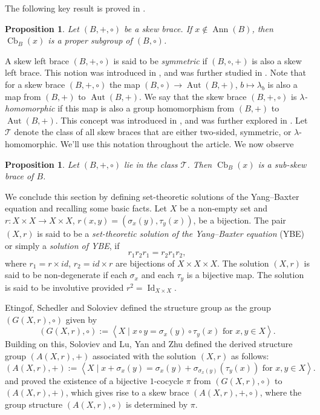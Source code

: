 \documentclass[11pt, oneside]{amsart}
\numberwithin{equation}{section}
\theoremstyle{plain}
\newtheorem{pro}[equation]{Proposition}
\theoremstyle{definition}
\newcommand{\Cb}{\operatorname{Cb} }
\newcommand{\Id}{\operatorname{Id}}
\newcommand{\gen}[1]{\left < #1 \right >}
\newcommand{\Aut}{\operatorname{Aut} }
\newcommand{\Ann}{\operatorname{Ann} }
\begin{document}
 The following key result is proved in \cite[Theorem 3.3]{CFT25}.

\begin{pro} %
   Let $(B, +, \circ)$ be a skew brace.    If $x \notin \Ann(B)$, then $\Cb_{B}(x)$ is a proper subgroup of  $(B, \circ)$.
\end{pro}



A skew left brace $(B, +, \circ)$ is said to be \emph{symmetric} if $(B, \circ, +)$ is also a skew left brace. This notion was introduced in \cite{LC19}, and was further studied in \cite{BNY23, AC20}. Note that for a skew brace $(B, +, \circ)$ the map $(B, \circ) \to \Aut(B, +)$, $b \mapsto \lambda_b$ is also a map from $(B, +)$ to $\Aut(B, +)$.  We say that the skew brace $(B, +, \circ)$ is \emph{$\lambda$-homomorphic} if this map is also a group homomorphism from $(B, +)$ to $\Aut(B, +)$.  This concept was introduced in \cite{CCD20}, and was further explored in \cite{BNY22}. Let $\mathcal{T}$ denote the class of all skew braces that are either two-sided, symmetric, or $\lambda$-homomorphic.  We'll use this notation throughout the article.  We now observe

\begin{pro}\label{TS-S-L}
    Let $(B, +, \circ)$ lie in the class $\mathcal{T}$.  Then $\Cb_{B}(x)$ is a sub-skew brace of $B$.
\end{pro}


We conclude this section by defining set-theoretic solutions of the Yang--Baxter equation and recalling some basic facts.
Let $X$ be a non-empty set and $r : X \times X \to X \times X$, 
$r(x, y) = (\sigma_x(y), \tau_y(x))$, be a bijection. The pair $(X, r)$ is said to be a {\it set-theoretic solution of the Yang--Baxter equation} (YBE) or simply a {\it solution of YBE}, if
$$
r_1 r_2 r_1 = r_2 r_1 r_2,
$$
where $r_1 = r \times id$, $r_2 = id \times r$ are bijections of $X \times X \times X$. 
The solution $(X,r)$ is said to be non-degenerate if each $\sigma_x$ and each $\tau_y$ is a bijective map. The solution is said to be involutive provided $r^2 = \Id_{X \times X}$.

Etingof, Schedler and Soloviev \cite{ESS99} defined  the structure group as the group $(G(X, r), \circ)$  given by 
$$(G(X,r), \circ) := \gen{X \mid x \circ y = \sigma_x(y) \circ \tau_y(x) \mbox{ for } x, y \in X}.$$
Building on this, Soloviev \cite{S2000} and Lu, Yan and Zhu \cite{LYZ20} defined the derived structure group $(A(X,r),+)$ associated with the solution $(X,r)$ as follows:
$$(A(X,r), +) := \gen{X \mid x + \sigma_x(y) = \sigma_x(y) + \sigma_{\sigma_x(y)}(\tau_y(x)) \mbox{ for } x, y \in X}.$$
and proved the existence of a bijective  $1$-cocycle $\pi$ from $(G(X,r), \circ)$ to $(A(X,r), +)$, which gives rise to a skew brace $(A(X, r), + , \circ)$, where the group structure $(A(X, r), \circ)$ is determined by $\pi$. 
\end{document}
